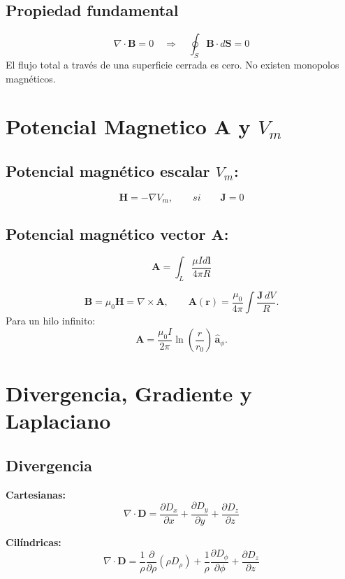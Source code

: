 \documentclass[11pt]{article}
\begin{document}
\subsection*{Propiedad fundamental}
\[
\nabla \cdot \mathbf{B} = 0 \quad \Rightarrow \quad
\oint_{S} \mathbf{B} \cdot d\mathbf{S} = 0
\]
El flujo total a través de una superficie cerrada es cero. No existen monopolos magnéticos.


\section{Potencial Magnetico \(\mathbf{A}\) y $V_m$ }
\subsection{Potencial magnético escalar $V_{m}$:}

\[\mathbf{H}= -\nabla V_m,\qquad si \qquad\mathbf{J} = 0\]

\subsection{Potencial magnético vector \(\mathbf{A}\):}

\[\]
\[\mathbf{A}= \int_{L}\frac{\mu Id\mathbf{l}}{4\pi R}
\]

\[
\mathbf{B}=\mu_0\mathbf{H}=\nabla\times\mathbf{A},
\qquad
\mathbf{A}(\mathbf{r})=\frac{\mu_0}{4\pi}\int
\frac{\mathbf{J}\,dV}{R}.
\]
Para un hilo infinito:
\[
\mathbf{A}= \frac{\mu_0 I}{2\pi}\ln\!\left(\frac{r}{r_0}\right)\,
\hat{\boldsymbol{a}}_{\phi}.
\]

\newpage

\section{Divergencia, Gradiente y Laplaciano}

\subsection{Divergencia}

\textbf{Cartesianas:}
\begin{equation}
    \nabla \cdot \mathbf{D} = \frac{\partial D_x}{\partial x} + \frac{\partial D_y}{\partial y} + \frac{\partial D_z}{\partial z}
\end{equation}

\textbf{Cilíndricas:}
\begin{equation}
    \nabla \cdot \mathbf{D} = \frac{1}{\rho} \frac{\partial}{\partial \rho} (\rho D_\rho) + \frac{1}{\rho} \frac{\partial D_\phi}{\partial \phi} + \frac{\partial D_z}{\partial z}
\end{equation}
\end{document}
